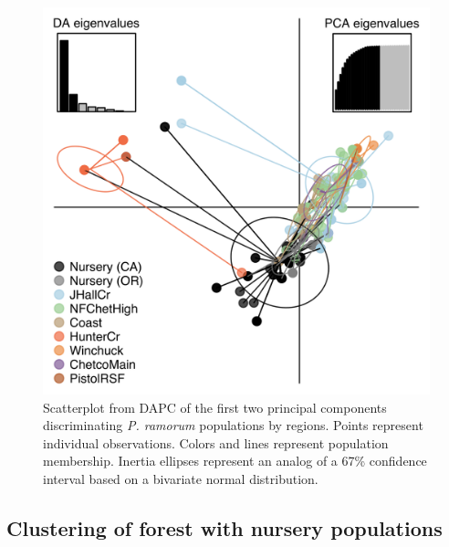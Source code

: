 \documentclass[double,12pt]{beavtex}
\begin{document}
  \begin{figure}
  
  {\centering \includegraphics[width=0.8\linewidth]{figure/phytopathology/figure_4} 
  
  }
  
  \caption[Scatterplot from DAPC of the first two principal components
  discriminating \emph{P. ramorum} populations by regions.]{Scatterplot from DAPC of the first two principal components
  discriminating \emph{P. ramorum} populations by regions. Points
  represent individual observations. Colors and lines represent population
  membership. Inertia ellipses represent an analog of a 67\% confidence
  interval based on a bivariate normal distribution.}\label{fig:ramfig4}
  \end{figure}
  
  \newpage
  
  \subsection{Clustering of forest with nursery
  populations}\label{clustering-of-forest-with-nursery-populations}
  
\end{document}
